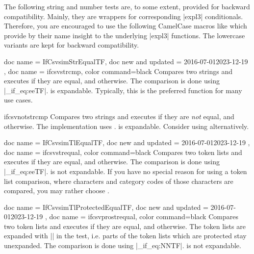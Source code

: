 \documentclass[a4paper,11pt]{ltxdoc}
\begin{document}
The following string and number tests are, to some extent, provided for
backward compatibility.
Mainly, they are wrappers for corresponding |expl3| conditionals.
Therefore, you are encouraged to use the following CamelCase macros
like  which provide by their name insight
to the underlying |expl3| functions. The lowercase variants are kept
for backward compatibility.
\medskip


\begin{docCommands}[
      doc parameter = \marg{string A}\marg{string B}\marg{true}\marg{false}
    ]
  {
    { doc name = IfCsvsimStrEqualTF, doc new and updated = {2016-07-01}{2023-12-19} },
    { doc name = ifcsvstrcmp, color command=black }
  }
  Compares two strings and executes  if they are equal, and  otherwise.
  The comparison is done using |\str_if_eq:eeTF|.
   is expandable.
  Typically, this is the preferred function for many use cases.
\end{docCommands}


\begin{docCommand}[doc new and updated={2016-07-01}{2021-06-28},color command=black]{ifcsvnotstrcmp}{}
  Compares two strings and executes  if they are \emph{not} equal, and  otherwise.
  The implementation uses .
   is expandable.
  Consider using  alternatively.
\end{docCommand}


\begin{docCommands}[
      doc parameter = \marg{token list A}\marg{token list B}\marg{true}\marg{false}
    ]
  {
    { doc name = IfCsvsimTlEqualTF, doc new and updated = {2016-07-01}{2023-12-19} },
    { doc name = ifcsvstrequal, color command=black }
  }
  Compares two token lists and executes  if they are equal, and  otherwise.
  The comparison is done using |\tl_if_eq:eeTF|.
   is not expandable.
  If you have no special reason for using a token list comparison, where
  characters and category codes of those characters are compared, you may
  rather choose .
\end{docCommands}



\begin{docCommands}[
      doc parameter = \marg{token list A}\marg{token list B}\marg{true}\marg{false}
    ]
  {
    { doc name = IfCsvsimTlProtectedEqualTF, doc new and updated = {2016-07-01}{2023-12-19} },
    { doc name = ifcsvprostrequal, color command=black }
  }
  Compares two token lists and executes  if they are equal, and  otherwise.
  The token lists are expanded with |\protected@edef|
  in the test, i.e. parts of the
  token lists which are protected stay unexpanded.
  The comparison is done using |\tl_if_eq:NNTF|.
   is not expandable.
\end{docCommands}
\end{document}
